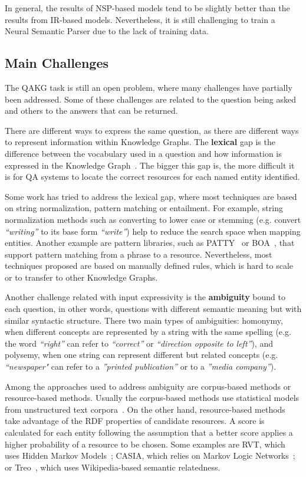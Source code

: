 In general, the results of NSP-based models tend to be slightly better than the results from 
IR-based models. Nevertheless, it is still challenging to train a Neural Semantic Parser due to 
the lack of training data.

\subsection{Main Challenges}
\label{cap2:qakg/challenges}
The QAKG task is still an open problem, where many challenges have partially been addressed. 
Some of these challenges are related to the question being asked and others to the answers that 
can be returned. 

There are different ways to express the same question, as there are different ways to represent 
information within Knowledge Graphs. The \textbf{lexical} gap is the difference between the 
vocabulary used in a question and how information is expressed in the Knowledge 
Graph~\cite{semPar:lexical-gap-HakimovUWC15}. The bigger this gap is, the more difficult it is 
for QA systems to locate the correct resources for each named entity identified. 

Some work has tried to address the lexical gap, where most techniques are based on string 
normalization, pattern matching or entailment. For example, string normalization methods such 
as converting to lower case or stemming (e.g. convert \textit{“writing”} to its base form 
\textit{“write”}) help to reduce the search space when mapping entities. Another example are 
pattern libraries, such as PATTY~\cite{qa:NakasholeWS12} or BOA~\cite{qa:GerberN12}, that 
support pattern matching from a phrase to a resource. Nevertheless, most techniques proposed 
are based on manually defined rules, which is hard to scale or to transfer to other Knowledge 
Graphs.

Another challenge related with input expressivity is the \textbf{ambiguity} bound to each 
question, in other words, questions with different semantic meaning but with similar syntactic 
structure. There two main types of ambiguities: homonymy, when different concepts are 
represented by a string with the same spelling (e.g. the word \textit{“right”} can refer to 
\textit{“correct”} or \textit{“direction opposite to left”}), and polysemy, when one string can 
represent different but related concepts (e.g. \textit{“newspaper"} can refer to a 
\textit{”printed publication”} or to a \textit{”media company”}). 

Among the approaches used to address ambiguity are corpus-based methods or resource-based 
methods. Usually the corpus-based methods use statistical models from unstructured text 
corpora~\cite{qa:shirai1997,qa:ShenYYJLC11}. On the other hand, resource-based methods take 
advantage of the RDF properties of candidate resources. A score is calculated for each entity 
following the assumption that a better score applies a higher probability of a resource to be 
chosen. Some examples are RVT, which uses Hidden Markov Models~\cite{qa:GiannoneBB13}; CASIA, 
which relies on Markov Logic Networks~\cite{qa:shizhu2014casia}; or Treo~\cite{qa:freitas2011treo,
qa:FreitasOOSC13}, which uses Wikipedia-based semantic relatedness.

